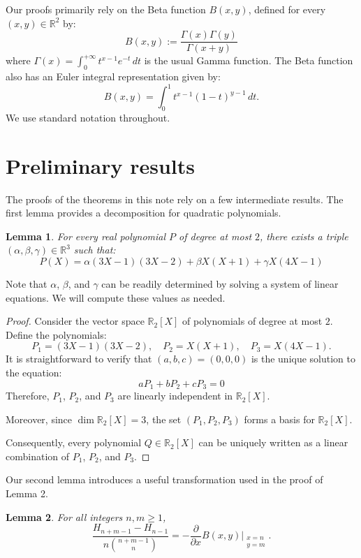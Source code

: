 \documentclass{amsart}
\numberwithin{equation}{section}
\newtheorem{lemma}{Lemma}
\newcommand{\R}{\mathbb R}
\begin{document}
Our proofs primarily rely on the Beta function $B(x,y)$, defined for every $(x,y)\in\R^2$ by:
\[B(x,y):=\frac{\Gamma(x)\Gamma(y)}{\Gamma(x+y)}\]
where $\Gamma(x)=\int_0^{+\infty}t^{x-1}e^{-t}\,dt$ is the usual Gamma function. The Beta function also has an Euler integral representation given by:
\begin{equation}
B(x,y)=\int_0^1t^{x-1}(1-t)^{y-1}\,dt.
\label{beta_int}
\end{equation}
We use standard notation throughout.
\section{Preliminary results}
The proofs of the theorems in this note rely on a few intermediate results. The first lemma provides a decomposition for quadratic polynomials.
\begin{lemma}
    For every real polynomial $P$ of degree at most $2$, there exists a triple $(\alpha,\beta,\gamma)\in\R^3$ such that:
    \[P(X)=\alpha (3X-1)(3X-2)+\beta X(X+1)+\gamma X(4X-1)\]
\end{lemma}
Note that $\alpha$, $\beta$, and $\gamma$ can be readily determined by solving a system of linear equations. We will compute these values as needed. 
\begin{proof}
    Consider the vector space $\R_2[X]$ of polynomials of degree at most $2$. Define the polynomials:
    \[P_1=(3X-1)(3X-2),\quad P_2=X(X+1),\quad P_3=X(4X-1).\]
    It is straightforward to verify that $(a,b,c)=(0,0,0)$ is the unique solution to the equation:
    \[aP_1+bP_2+cP_3=0\]
    Therefore, $P_1$, $P_2$, and $P_3$ are linearly independent in $\R_2[X]$.
    
    Moreover, since $\dim\R_2[X]=3$, the set $(P_1,P_2,P_3)$ forms a basis for $\R_2[X]$. 

    Consequently, every polynomial $Q\in\R_2[X]$ can be uniquely written as a linear combination of $P_1$, $P_2$, and $P_3$.
\end{proof}
Our second lemma introduces a useful transformation used in the proof of Lemma 2.
\begin{lemma}
    For all integers $n,m\ge1$, 
    \begin{equation}
     \frac{H_{n+m-1}-H_{n-1}}{n\binom{n+m-1}{n}}=-\frac{\partial}{\partial x}B(x,y)\Bigg|_{\substack{x=n\\y=m}}.
    \label{lem2}
    \end{equation}
\end{lemma}
\end{document}
